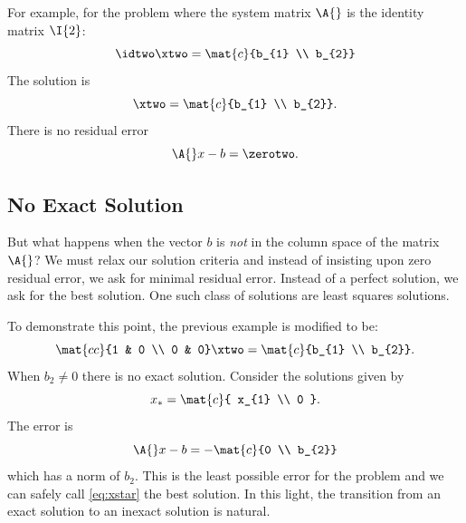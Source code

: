 For example, for the problem where the system matrix $\A{}$ is the identity matrix $\I{2}$:
  \begin{equation*}   %
      \idtwo \xtwo = \mat{c}{b_{1} \\ b_{2}}
  \end{equation*}
The solution is
  \begin{equation*}   %
      \xtwo = \mat{c}{b_{1} \\ b_{2}} .
  \end{equation*}
There is no residual error 
  \begin{equation*}   %
      \A{} x - b = \zerotwo .
  \end{equation*}

\subsection{\label{ssec:no exact soln}No Exact Solution}  %
But what happens when the vector $b$ is \emph{not} in the column space of the matrix $\A{}$? We must relax our solution criteria and instead of insisting upon zero residual error, we ask for minimal residual error. Instead of a perfect solution, we ask for the best solution. One such class of solutions are least squares solutions.

To demonstrate this point, the previous example is modified to be:
  \begin{equation*}   %
      \mat{cc}{1 & 0 \\ 0 & 0} \xtwo = \mat{c}{b_{1} \\ b_{2}} .
  \end{equation*}
When $b_{2} \ne 0$ there is no exact solution. Consider the solutions given by
  \begin{equation}   %
      x_{*} = \mat{c}{ x_{1} \\ 0 } .
      \label{eq:xstar}
  \end{equation}
The error is 
  \begin{equation*}   %
      \A{} x - b = -\mat{c}{0 \\ b_{2}}
  \end{equation*}
which has a norm of $b_{2}$. This is the least possible error for the problem and we can safely call \eqref{eq:xstar} the best solution. In this light, the transition from an exact solution to an inexact solution is natural.

